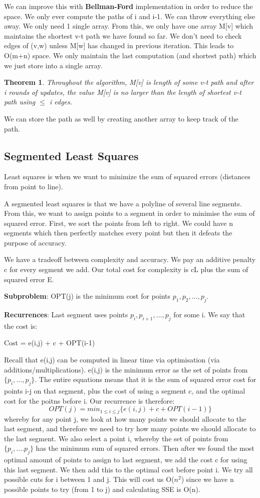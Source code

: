 \documentclass[11pt, oneside]{article}
\newtheorem{theorem}{Theorem}
\theoremstyle{definition}
\begin{document}
We can improve this with \textbf{Bellman-Ford} implementation in order to reduce the space. We only ever compute the paths of i and i-1. We can throw everything else away. We only need 1 single array. From this, we only have one array M[v] which maintains the shortest v-t path we have found so far. We don't need to check edges of (v,w) unless M[w] has changed in previous iteration. This leads to O(m+n) space. We only maintain the last computation (and shortest path) which we just store into a single array.
\begin{theorem}
  Throughout the algorithm, M[v] is length of some v-t path and after i rounds of updates, the value M[v] is no larger than the length of shortest v-t path using $\leq$ i edges.
\end{theorem}

We can store the path as well by creating another array to keep track of the path.
\subsection{Segmented Least Squares}
Least squares is when we want to minimize the sum of squared errors (distances from point to line).

A segmented least squares is that we have a polyline of several line segments. From this, we want to assign points to a segment in order to minimise the sum of squared error. First, we sort the points from left to right. We could have n segments which then perfectly matches every point but then it defeats the purpose of accuracy.

We have a tradeoff between complexity and accuracy. We pay an additive penalty c for every segment we add. Our total cost for complexity is cL plus the sum of squared error E.

\textbf{Subproblem}: OPT(j) is the minimum cost for points $p_1,p_2,...,p_j$.

\textbf{Recurrences}: Last segment uses points $p_i,p_{i+1},...,p_j$ for some i. We say that the cost is:
\begin{center}
  Cost = e(i,j) + c + OPT(i-1)
\end{center}
Recall that e(i,j) can be computed in linear time via optimisation (via additions/multiplications). e(i,j) is the minimum error as the set of points from $\{p_i,...,p_j\}$. The entire equations means that it is the sum of squared error cost for points i-j on that segment, plus the cost of using a segment c, and the optimal cost for the poitns before i. Our recurrence is therefore:
$$
OPT(j) = min_{1 \leq i \leq j}\{e(i,j) + c + OPT(i-1)\}
$$
whereby for any point j, we look at how many points we should allocate to the last segment, and therefore we need to try how many points we should allocate to the last segment. We also select a point i, whereby the set of points from $\{p_i,....p_j\}$ has the minimum sum of squared errors. Then after we found the most optimal amount of points to assign to last segment, we add the cost c for using this last segment. We then add this to the optimal cost before point i. We try all possible cuts for i between 1 and j. This will cost us O($n^2$) since we have n possible points to try (from 1 to j) and calculating SSE is O(n).
\end{document}
